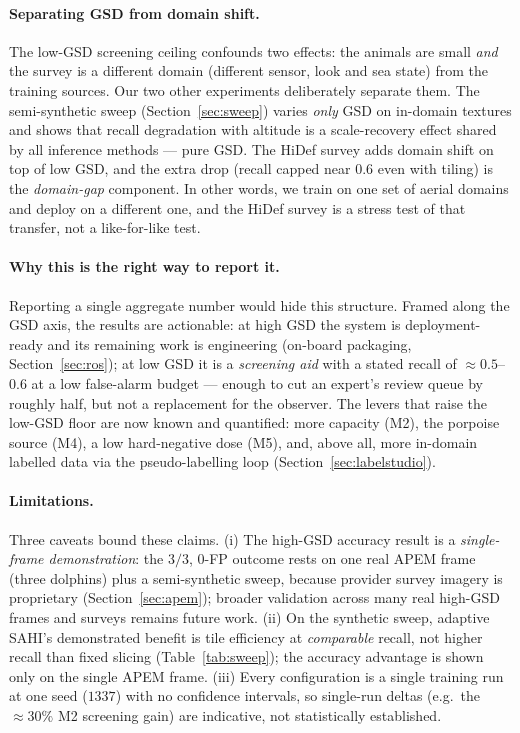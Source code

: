 \documentclass[11pt,a4paper]{article}
\begin{document}
\paragraph{Separating GSD from domain shift.}
The low-GSD screening ceiling confounds two effects: the animals are small
\emph{and} the survey is a different domain (different sensor, look and sea
state) from the training sources. Our two other experiments deliberately
separate them. The semi-synthetic sweep (Section~\ref{sec:sweep}) varies
\emph{only} GSD on in-domain textures and shows that recall degradation with
altitude is a scale-recovery effect shared by all inference methods --- pure GSD.
The HiDef survey adds domain shift on top of low GSD, and the extra
drop (recall capped near $0.6$ even with tiling) is the \emph{domain-gap}
component. In other words, we train on one set of aerial domains and deploy on a
different one, and the HiDef survey is a stress test of that transfer,
not a like-for-like test.

\paragraph{Why this is the right way to report it.}
Reporting a single aggregate number would hide this structure. Framed along the
GSD axis, the results are actionable: at high GSD the system is
deployment-ready and its remaining work is engineering (on-board packaging,
Section~\ref{sec:ros}); at
low GSD it is a \emph{screening aid} with a stated recall of $\approx\!0.5$--$0.6$
at a low false-alarm budget --- enough to cut an expert's review queue by
roughly half, but not a replacement for the observer. The levers that raise the
low-GSD floor are now known and quantified: more capacity (M2), the porpoise
source (M4), a low hard-negative dose (M5), and, above all, more in-domain
labelled data via the pseudo-labelling loop (Section~\ref{sec:labelstudio}).

\paragraph{Limitations.} Three caveats bound these claims. (i) The high-GSD
accuracy result is a \emph{single-frame demonstration}: the $3/3$, $0$-FP
outcome rests on one real APEM frame (three dolphins) plus a semi-synthetic
sweep, because provider survey imagery is proprietary
(Section~\ref{sec:apem}); broader validation across many real high-GSD frames
and surveys remains future work. (ii) On the synthetic sweep, adaptive SAHI's
demonstrated benefit is tile efficiency at \emph{comparable} recall, not higher
recall than fixed slicing (Table~\ref{tab:sweep}); the accuracy advantage is
shown only on the single APEM frame. (iii) Every configuration is a single
training run at one seed ($1337$) with no confidence intervals, so single-run
deltas (e.g.\ the $\approx\!30\%$ M2 screening gain) are indicative, not
statistically established.
\end{document}

